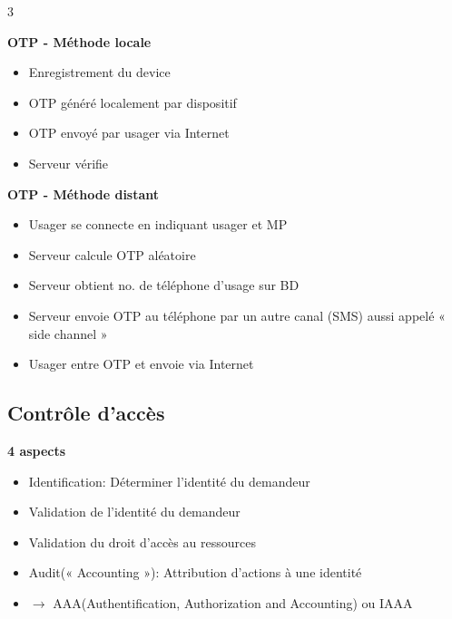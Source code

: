 \documentclass[9pt, a4paper, twoside]{article}
\begin{document}
\begin{multicols}{3}
\begin{flushleft}
    \scriptsize \textbf{OTP - Méthode locale}
\end{flushleft}

\begin{itemize}[label=$\bullet$]
    \item \scriptsize Enregistrement du device
    \item \scriptsize OTP généré localement par dispositif
    \item \scriptsize OTP envoyé par usager via Internet
    \item \scriptsize Serveur vérifie
\end{itemize}

\begin{flushleft}
    \scriptsize \textbf{OTP - Méthode distant}
\end{flushleft}

\begin{itemize}[label=$\bullet$]
    \item \scriptsize Usager se connecte en indiquant usager et MP
    \item \scriptsize Serveur calcule OTP aléatoire
    \item \scriptsize Serveur obtient no. de téléphone d'usage sur BD
    \item \scriptsize Serveur envoie OTP au téléphone par un autre canal (SMS) aussi appelé « side channel »
    \item \scriptsize Usager entre OTP et envoie via Internet
\end{itemize}

\footnotesize \subsection{Contrôle d'accès}

\begin{flushleft}
    \scriptsize \textbf{4 aspects}
\end{flushleft}

\begin{itemize}[label={}]
    \item \scriptsize Identification: Déterminer l'identité du demandeur
    \item \scriptsize Validation de l'identité du demandeur
    \item \scriptsize Validation du droit d'accès au ressources
    \item \scriptsize Audit(« Accounting »): Attribution d'actions à une identité
    \item \scriptsize $\rightarrow$ AAA(Authentification, Authorization and Accounting) ou IAAA
\end{itemize}


\end{multicols}
\end{document}
